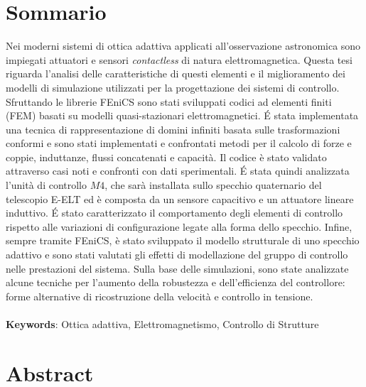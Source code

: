 
\begingroup
\let\clearpage\relax
\let\cleardoublepage\relax
\let\cleardoublepage\relax

\chapter*{Sommario}
Nei moderni sistemi di ottica adattiva applicati all'osservazione astronomica sono impiegati attuatori e sensori \textit{contactless} di natura elettromagnetica. Questa tesi riguarda l'analisi delle caratteristiche di questi elementi e il miglioramento dei modelli di simulazione utilizzati per la progettazione dei sistemi di controllo. Sfruttando le librerie FEniCS sono stati sviluppati codici ad elementi finiti (FEM) basati su modelli quasi-stazionari elettromagnetici. \'E stata implementata una tecnica di rappresentazione di domini infiniti basata sulle trasformazioni conformi e sono stati implementati e confrontati metodi per il calcolo di forze e coppie, induttanze, flussi concatenati e capacità. Il codice è stato validato attraverso casi noti e confronti con dati sperimentali. 
\'E stata quindi analizzata l'unità di controllo $M4$, che sarà installata sullo specchio quaternario del telescopio E-ELT ed è composta da un sensore capacitivo e un attuatore lineare induttivo. \'E stato caratterizzato il comportamento degli elementi di controllo rispetto alle variazioni di configurazione legate alla forma dello specchio. 
Infine, sempre tramite FEniCS, è stato sviluppato il modello strutturale di uno specchio adattivo e sono stati valutati gli effetti di modellazione del gruppo di controllo nelle prestazioni del sistema. Sulla base delle simulazioni, sono state analizzate alcune tecniche per l'aumento della robustezza e dell'efficienza del controllore: forme alternative di ricostruzione della velocità e controllo in tensione.\\\\
\textbf{Keywords}: Ottica adattiva, Elettromagnetismo, Controllo di Strutture
\newpage
{}
\chapter*{Abstract}

